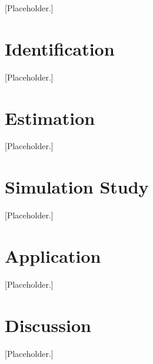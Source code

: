 \documentclass[12pt]{article}
\begin{document}
\begin{assumption}
\label{ass:core}
[Placeholder.]
\end{assumption}

\section{Identification}
\label{sec:id}
[Placeholder.]

\section{Estimation}
\label{sec:estimation}
[Placeholder.]

\section{Simulation Study}
\label{sec:sims}
[Placeholder.]

\section{Application}
\label{sec:application}
[Placeholder.]

\section{Discussion}
\label{sec:discussion}
[Placeholder.]
\end{document}

